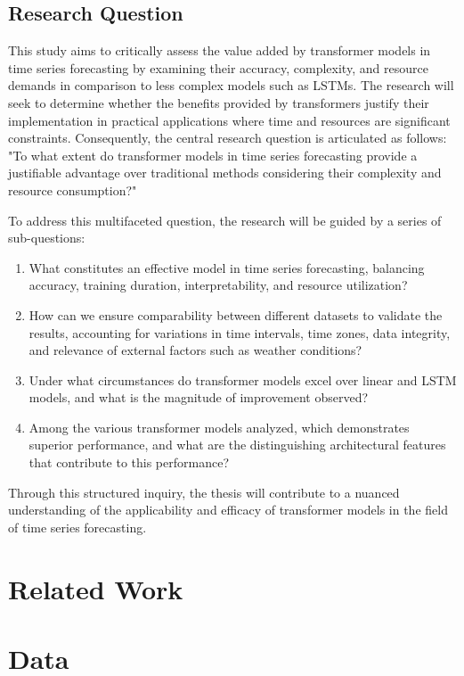 \documentclass{article}
\begin{document}
\subsection{Research Question}

This study aims to critically assess the value added by transformer models in time series forecasting by examining their accuracy, complexity, and resource demands in comparison to less complex models such as LSTMs. The research will seek to determine whether the benefits provided by transformers justify their implementation in practical applications where time and resources are significant constraints. Consequently, the central research question is articulated as follows: "To what extent do transformer models in time series forecasting provide a justifiable advantage over traditional methods considering their complexity and resource consumption?"

To address this multifaceted question, the research will be guided by a series of sub-questions:

\begin{enumerate}
    \item What constitutes an effective model in time series forecasting, balancing accuracy, training duration, interpretability, and resource utilization?
    \item How can we ensure comparability between different datasets to validate the results, accounting for variations in time intervals, time zones, data integrity, and relevance of external factors such as weather conditions?
    \item Under what circumstances do transformer models excel over linear and LSTM models, and what is the magnitude of improvement observed?
    \item Among the various transformer models analyzed, which demonstrates superior performance, and what are the distinguishing architectural features that contribute to this performance?
\end{enumerate}

Through this structured inquiry, the thesis will contribute to a nuanced understanding of the applicability and efficacy of transformer models in the field of time series forecasting.

\section{Related Work}

\section{Data}
\end{document}
